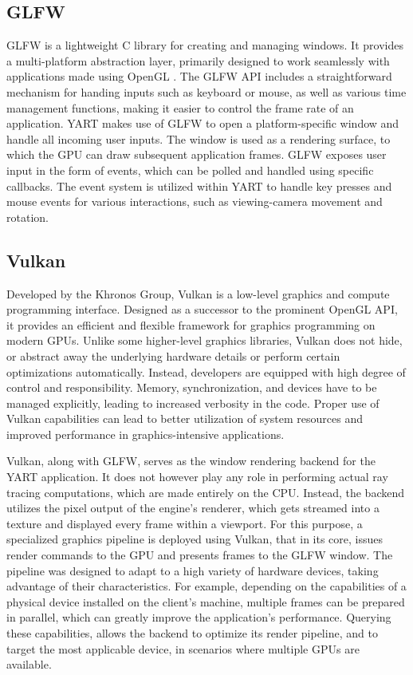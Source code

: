 \subsection{GLFW}

GLFW \supercite{GLFW} is a lightweight C library for creating and managing windows.
It provides a multi-platform abstraction layer, primarily designed to work seamlessly with applications made using OpenGL \supercite{Neider1993}.
The GLFW API includes a straightforward mechanism for handing inputs such as keyboard or mouse, as well as various time management functions, making it easier to control the frame rate of an application.
YART makes use of GLFW to open a platform-specific window and handle all incoming user inputs. 
The window is used as a rendering surface, to which the GPU can draw subsequent application frames. 
GLFW exposes user input in the form of events, which can be polled and handled using specific callbacks. 
The event system is utilized within YART to handle key presses and mouse events for various interactions, such as viewing-camera movement and rotation.

\subsection{Vulkan}

Developed by the Khronos Group, Vulkan \supercite{Sellers2016} is a low-level graphics and compute programming interface.
Designed as a successor to the prominent OpenGL API, it provides an efficient and flexible framework for graphics programming on modern GPUs.
Unlike some higher-level graphics libraries, Vulkan does not hide, or abstract away the underlying hardware details or perform certain optimizations automatically. 
Instead, developers are equipped with high degree of control and responsibility.
Memory, synchronization, and devices have to be managed explicitly, leading to increased verbosity in the code.
Proper use of Vulkan capabilities can lead to better utilization of system resources and improved performance in graphics-intensive applications.

Vulkan, along with GLFW, serves as the window rendering backend for the YART application.
It does not however play any role in performing actual ray tracing computations, which are made entirely on the CPU. 
Instead, the backend utilizes the pixel output of the engine's renderer, which gets streamed into a texture and displayed every frame within a viewport.
For this purpose, a specialized graphics pipeline is deployed using Vulkan, that in its core, issues render commands to the GPU and presents frames to the GLFW window. The pipeline was designed to adapt to a high variety of hardware devices, taking advantage of their characteristics.
For example, depending on the capabilities of a physical device installed on the client's machine, multiple frames can be prepared in parallel, which can greatly improve the application's performance.
Querying these capabilities, allows the backend to optimize its render pipeline, and to target the most applicable device, in scenarios where multiple GPUs are available.

